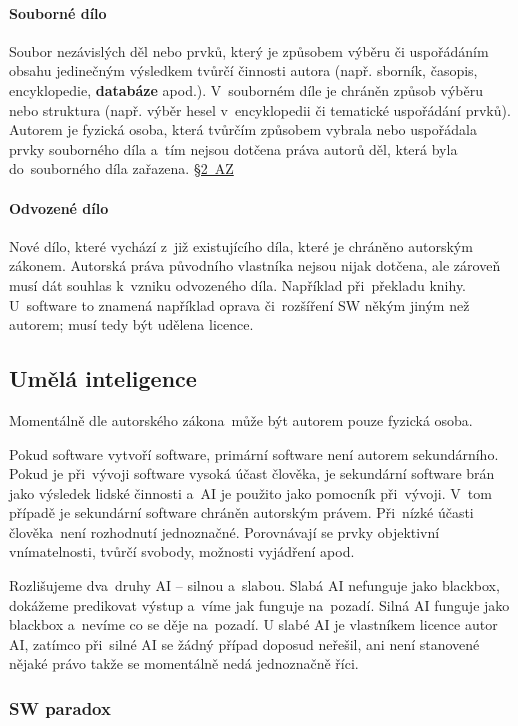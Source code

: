\paragraph{Souborné dílo} Soubor nezávislých děl nebo prvků, který je způsobem výběru či uspořádáním obsahu jedinečným výsledkem tvůrčí činnosti autora (např. sborník, časopis, encyklopedie, \textbf{databáze} apod.). V~souborném díle je chráněn způsob výběru nebo struktura (např. výběr hesel v~encyklopedii či tematické uspořádání prvků). Autorem je fyzická osoba, která tvůrčím způsobem vybrala nebo uspořádala prvky souborného díla a~tím nejsou dotčena práva autorů děl, která byla do~souborného díla zařazena. \href{https://www.zakonyprolidi.cz/cs/2000-121#p2}{§2~AZ}

\paragraph{Odvozené dílo} Nové dílo, které vychází z~již existujícího díla, které je chráněno autorským zákonem. Autorská práva původního vlastníka nejsou nijak dotčena, ale zároveň musí dát souhlas k~vzniku odvozeného díla. Například při~překladu knihy. U~software to znamená například oprava či~rozšíření SW někým jiným než autorem; musí tedy být udělena licence.

\subsection{Umělá inteligence}

Momentálně dle autorského zákona~může být autorem pouze fyzická osoba.

Pokud software vytvoří software, primární software není autorem sekundárního. Pokud je při~vývoji software vysoká účast člověka, je sekundární software brán jako výsledek lidské činnosti a~AI je použito jako pomocník při~vývoji. V~tom případě je sekundární software chráněn autorským právem. Při~nízké účasti člověka~není rozhodnutí jednoznačné. Porovnávají se prvky objektivní vnímatelnosti, tvůrčí svobody, možnosti vyjádření apod.

Rozlišujeme dva~druhy AI -- silnou a~slabou. Slabá AI nefunguje jako blackbox, dokážeme predikovat výstup a~víme jak funguje na~pozadí. Silná AI funguje jako blackbox a~nevíme co se děje na~pozadí. U slabé AI je vlastníkem licence autor AI, zatímco při~silné AI se žádný případ doposud neřešil, ani není stanovené nějaké právo takže se momentálně nedá jednoznačně říci.

\subsubsection{SW paradox}

